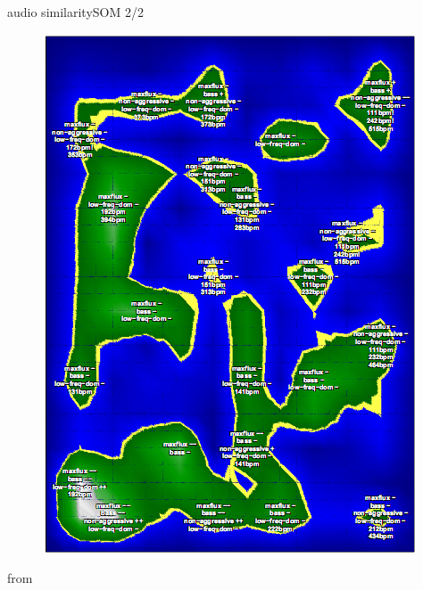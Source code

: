         \begin{frame}{audio similarity}{SOM 2/2}
            \vspace{-2mm}
            \begin{figure}
                \centering
                \includegraphics[scale=.28]{graph/som}
            \end{figure}
            \vspace{-10mm}from 
        \end{frame}
    
